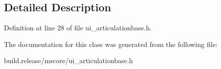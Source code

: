 \subsection{Detailed Description}


Definition at line 28 of file ui\+\_\+articulationbase.\+h.



The documentation for this class was generated from the following file\+:\begin{DoxyCompactItemize}
\item 
build.\+release/mscore/ui\+\_\+articulationbase.\+h\end{DoxyCompactItemize}
